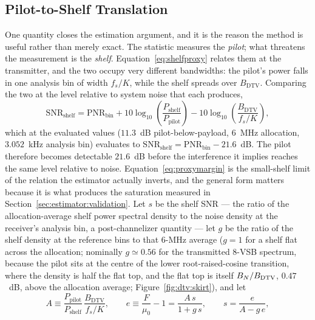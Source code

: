 \subsection{Pilot-to-Shelf Translation}
\label{sec:estimator:translation}

One quantity closes the estimation argument, and it is the reason the method is useful rather than merely exact. The statistic measures the \emph{pilot}; what threatens the measurement is the \emph{shelf}. Equation~\eqref{eq:shelfproxy} relates them at the transmitter, and the two occupy very different bandwidths: the pilot's power falls in one analysis bin of width $f_s/K$, while the shelf spreads over $B_{\text{DTV}}$. Comparing the two at the level relative to system noise that each produces,
\begin{equation}
\label{eq:proxymargin}
\mathrm{SNR}_{\text{shelf}}
= \mathrm{PNR}_{\text{bin}}
+ 10\log_{10}\!\left(\frac{P_{\text{shelf}}}{P_{\text{pilot}}}\right)
- 10\log_{10}\!\left(\frac{B_{\text{DTV}}}{f_s/K}\right),
\end{equation}
which at the evaluated values ($11.3$~dB pilot-below-payload, $6$~MHz allocation, $3.052$~kHz analysis bin) evaluates to $\mathrm{SNR}_{\text{shelf}}=\mathrm{PNR}_{\text{bin}}-21.6$~dB. The pilot therefore becomes detectable $21.6$~dB before the interference it implies reaches the same level relative to noise. Equation~\eqref{eq:proxymargin} is the small-shelf limit of the relation the estimator actually inverts, and the general form matters because it is what produces the saturation measured in Section~\ref{sec:estimator:validation}. Let $s$ be the shelf SNR --- the ratio of the allocation-average shelf power spectral density to the noise density at the receiver's analysis bin, a post-channelizer quantity --- let $g$ be the ratio of the shelf density at the reference bins to that $6$-MHz average ($g = 1$ for a shelf flat across the allocation; nominally $g \simeq 0.56$ for the transmitted 8-VSB spectrum, because the pilot sits at the centre of the lower root-raised-cosine transition, where the density is half the flat top, and the flat top is itself $B_N/B_{\rm DTV}$, $0.47$~dB, above the allocation average; Figure~\ref{fig:dtv:skirt}), and let
\begin{equation}
\label{eq:estimator:inversion}
A \equiv \frac{P_{\text{pilot}}}{P_{\text{shelf}}}\,\frac{B_{\text{DTV}}}{f_s/K}, \qquad
e \equiv \frac{F}{\mu_0} - 1 = \frac{A\,s}{1+g\,s}, \qquad
s = \frac{e}{A-g\,e},
\end{equation}
